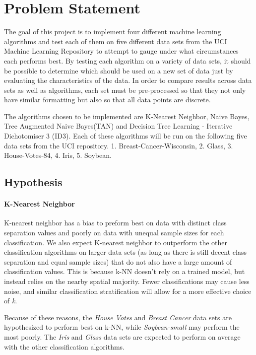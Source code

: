 \section{Problem Statement} \label{sec:problem statement}
The goal of this project is to implement four different machine learning algorithms and test each of them on five different data sets from the UCI Machine Learning Repository to attempt to gauge under what circumstances each performs best.
By testing each algorithm on a variety of data sets, it should be possible to determine which should be used on a new set of data just by evaluating the characteristics of the data. 
In order to compare results across data sets as well as algorithms, each set must be pre-processed so that they not only have similar formatting but also so that all data points are discrete. 

The algorithms chosen to be implemented are K-Nearest Neighbor, Naive Bayes, Tree Augmented Naive Bayes(TAN) and Decision Tree Learning - Iterative Dichotomiser 3 (ID3). Each of these algorithms will be run on the following five data sets from the UCI repository. 1. Breast-Cancer-Wisconsin, 2. Glass, 3. House-Votes-84, 4. Iris, 5. Soybean.\cite{Lichman}

\subsection{Hypothesis} \label{subsec:hypothesis}

\paragraph{K-Nearest Neighbor}
K-nearest neighbor has a bias to preform best on data with distinct class separation values and poorly on data with unequal sample sizes for each classification.
We also expect K-nearest neighbor to outperform the other classification algorithms on larger data sets (as long as there is still decent class separation and equal sample sizes) that do not also have a large amount of classification values. 
This is because k-NN doesn't rely on a trained model, but instead relies on the nearby spatial majority.
Fewer classifications may cause less noise, and similar classification stratification will allow for a more effective choice of \textit{k}. 

Because of these reasons, the \textit{House Votes} and \textit{Breast Cancer} data sets are hypothesized to perform best on k-NN, while \textit{Soybean-small} may perform the most poorly.
The \textit{Iris} and \textit{Glass} data sets are expected to perform on average with the other classification algorithms.

